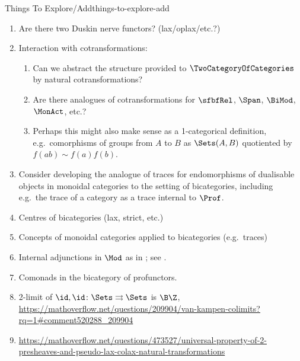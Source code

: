 \begin{remark}{Things To Explore/Add}{things-to-explore-add}
\begin{enumerate}
\begin{enumerate}
                    \[
                        \Hom_{\cHom_{\CatFont{C}}(A,B)}(F,G)%
                        \cong%
                        \Hom_{\cHom_{\CatFont{C}}(A,B)}(F\circ\id_{A},G)%
                    \]%
                    for each $F,G\in\Obj(\cHom_{\CatFont{C}}(A,B))$?
                \item Similarly, do we have an induced isomorphism of the form
                    \[
                        \Hom_{\cHom_{\CatFont{C}}(A,B)}(F,G)%
                        \cong%
                        \Hom_{\cHom_{\CatFont{C}}(A,B)}(F,\id_{B}\circ G)%
                    \]%
                    and so on?
            \end{enumerate}
        \item Are there two Duskin nerve functors? (lax/oplax/etc.?)
        \item Interaction with cotransformations:
            \begin{enumerate}
                \item Can we abstract the structure provided to $\TwoCategoryOfCategories$ by natural cotransformations?
                \item Are there analogues of cotransformations for $\sfbfRel$, $\Span$, $\BiMod$, $\MonAct$, etc.?
                \item Perhaps this might also make sense as a 1-categorical definition, e.g.\ comorphisms of groups from $A$ to $B$ as $\Sets(A,B)$ quotiented by $f(ab)\sim f(a)f(b)$.
            \end{enumerate}
        \item Consider developing the analogue of traces for endomorphisms of dualisable objects in monoidal categories to the setting of bicategories, including e.g.\ the trace of a category as a trace internal to $\Prof$.
        \item Centres of bicategories (lax, strict, etc.)
        \item Concepts of monoidal categories applied to bicategories (e.g.\ traces)
        \item Internal adjunctions in $\Mod$ as in \cite[Section 6.3]{2-categories-book}; see \cite[Example 6.2.6]{2-categories-book}.
        \item Comonads in the bicategory of profunctors.
        \item 2-limit of $\id,\id\colon\Sets\rightrightarrows\Sets$ is $\B\Z$, \url{https://mathoverflow.net/questions/209904/van-kampen-colimits?rq=1#comment520288_209904}
        \item \url{https://mathoverflow.net/questions/473527/universal-property-of-2-presheaves-and-pseudo-lax-colax-natural-transformations}

\end{enumerate}
\end{remark}
